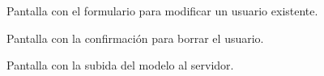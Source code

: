 \begin{figure}[h]
	\caption{Pantalla con el formulario para modificar un usuario existente.}
	\label{fig:modificar_usuario}
\end{figure}

\begin{figure}[h]
	\caption{Pantalla con la confirmación para borrar el usuario.}
	\label{fig:eliminar_usuario}
\end{figure}

\begin{figure}[h]
	\caption{Pantalla con la subida del modelo al servidor.}
	\label{fig:modificar_modelo}
\end{figure}
